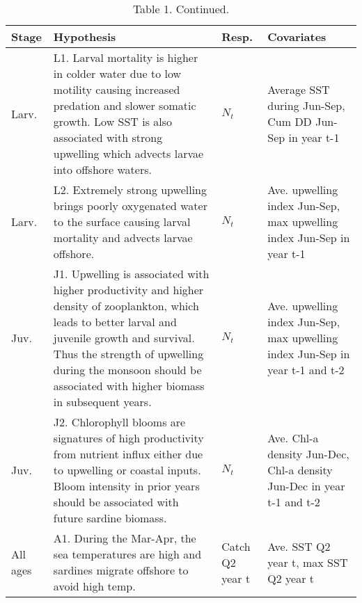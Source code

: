 \hypertarget{section}{%
\section{}\label{section}}

\clearpage

\begin{table}[t]

\caption{\label{tab:unnamed-chunk-3}Table 1. Continued.}
\centering
\begin{tabular}{>{\raggedright\arraybackslash}p{1cm}|>{\raggedright\arraybackslash}p{8.5cm}|>{\raggedright\arraybackslash}p{1cm}|>{\raggedright\arraybackslash}p{3cm}}
\hline
Stage & Hypothesis & Resp. & Covariates\\
\hline
Larv. & L1.  Larval mortality is higher in colder water due to low motility causing increased predation and slower somatic growth. Low SST is also associated with strong upwelling which advects larvae into offshore waters. & $N_t$ & Average SST during Jun-Sep, Cum DD Jun-Sep in year t-1\\
\hline
Larv. & L2. Extremely strong upwelling brings poorly oxygenated water to the surface causing larval mortality and advects larvae offshore. & $N_t$ & Ave. upwelling index Jun-Sep, max upwelling index Jun-Sep in year t-1\\
\hline
Juv. & J1. Upwelling is associated with higher productivity and higher density of zooplankton, which leads to better larval and juvenile growth and survival.  Thus the strength of upwelling during the monsoon should be associated with higher biomass in subsequent years. & $N_t$ & Ave. upwelling index Jun-Sep, max upwelling index Jun-Sep in year t-1 and t-2\\
\hline
Juv. & J2. Chlorophyll blooms are signatures of high productivity from nutrient influx either due to upwelling or coastal inputs.  Bloom intensity in prior years should be associated with future sardine biomass. & $N_t$ & Ave. Chl-a density Jun-Dec, Chl-a density Jun-Dec in year t-1 and t-2\\
\hline
All ages & A1. During the Mar-Apr, the sea temperatures are high and sardines migrate offshore to avoid high temp. & Catch Q2 year t & Ave. SST Q2 year t, max SST Q2 year t\\
\hline
\end{tabular}
\end{table}

